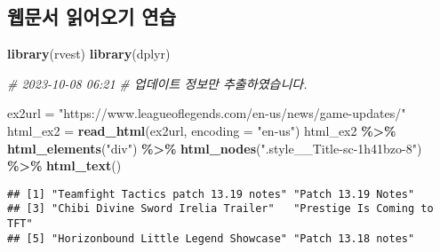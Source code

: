 \documentclass[
]{article}
\newenvironment{Shaded}{\begin{snugshade}}{\end{snugshade}}
\newcommand{\AttributeTok}[1]{\textcolor[rgb]{0.13,0.29,0.53}{#1}}
\newcommand{\CommentTok}[1]{\textcolor[rgb]{0.56,0.35,0.01}{\textit{#1}}}
\newcommand{\FunctionTok}[1]{\textcolor[rgb]{0.13,0.29,0.53}{\textbf{#1}}}
\newcommand{\NormalTok}[1]{#1}
\newcommand{\OtherTok}[1]{\textcolor[rgb]{0.56,0.35,0.01}{#1}}
\newcommand{\SpecialCharTok}[1]{\textcolor[rgb]{0.81,0.36,0.00}{\textbf{#1}}}
\newcommand{\StringTok}[1]{\textcolor[rgb]{0.31,0.60,0.02}{#1}}
\begin{document}
\hypertarget{uxc6f9uxbb38uxc11c-uxc77duxc5b4uxc624uxae30-uxc5f0uxc2b5}{%
\subsection{웹문서 읽어오기
연습}\label{uxc6f9uxbb38uxc11c-uxc77duxc5b4uxc624uxae30-uxc5f0uxc2b5}}

\begin{Shaded}
\begin{Highlighting}[]
\FunctionTok{library}\NormalTok{(rvest)}
\FunctionTok{library}\NormalTok{(dplyr)}

\CommentTok{\# 2023{-}10{-}08 06:21 }
\CommentTok{\# 업데이트 정보만 추출하였습니다.}

\NormalTok{ex2url }\OtherTok{=} \StringTok{"https://www.leagueoflegends.com/en{-}us/news/game{-}updates/"}
\NormalTok{html\_ex2 }\OtherTok{=} \FunctionTok{read\_html}\NormalTok{(ex2url, }\AttributeTok{encoding =} \StringTok{"en{-}us"}\NormalTok{)}
\NormalTok{html\_ex2 }\SpecialCharTok{\%\textgreater{}\%} \FunctionTok{html\_elements}\NormalTok{(}\StringTok{"div"}\NormalTok{) }\SpecialCharTok{\%\textgreater{}\%} \FunctionTok{html\_nodes}\NormalTok{(}\StringTok{".style\_\_Title{-}sc{-}1h41bzo{-}8"}\NormalTok{) }\SpecialCharTok{\%\textgreater{}\%} \FunctionTok{html\_text}\NormalTok{()}
\end{Highlighting}
\end{Shaded}

\begin{verbatim}
## [1] "Teamfight Tactics patch 13.19 notes" "Patch 13.19 Notes"                  
## [3] "Chibi Divine Sword Irelia Trailer"   "Prestige Is Coming to TFT"          
## [5] "Horizonbound Little Legend Showcase" "Patch 13.18 notes"
\end{verbatim}
\end{document}
